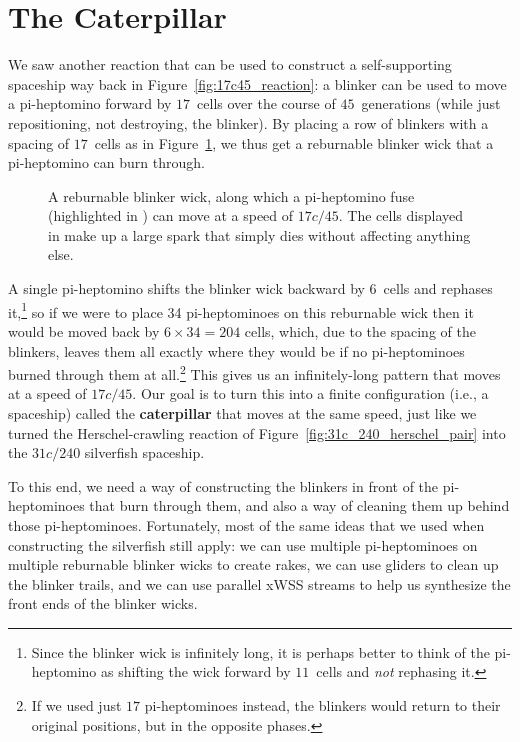 \section{The Caterpillar}\label{sec:caterpillar}

We saw another reaction that can be used to construct a self-supporting spaceship way back in Figure~\ref{fig:17c45_reaction}: a blinker can be used to move a pi-heptomino forward by $17$~cells over the course of $45$~generations (while just repositioning, not destroying, the blinker). By placing a row of blinkers with a spacing of $17$~cells as in Figure~\ref{fig:reburnable_blinker_wick}, we thus get a reburnable blinker wick that a pi-heptomino can burn through.

\begin{figure}[!htb]
	\centering
	\caption{A reburnable blinker wick, along which a pi-heptomino fuse (highlighted in ) can move at a speed of $17c/45$. The cells displayed in  make up a large spark that simply dies without affecting anything else.}\label{fig:reburnable_blinker_wick}
\end{figure}

A single pi-heptomino shifts the blinker wick backward by $6$~cells and rephases it,\footnote{Since the blinker wick is infinitely long, it is perhaps better to think of the pi-heptomino as shifting the wick forward by $11$~cells and \emph{not} rephasing it.} so if we were to place 34 pi-heptominoes on this reburnable wick then it would be moved back by $6 \times 34 = 204$ cells, which, due to the spacing of the blinkers, leaves them all exactly where they would be if no pi-heptominoes burned through them at all.\footnote{If we used just $17$ pi-heptominoes instead, the blinkers would return to their original positions, but in the opposite phases.} This gives us an infinitely-long pattern that moves at a speed of $17c/45$. Our goal is to turn this into a finite configuration (i.e., a spaceship) called the \textbf{caterpillar} that moves at the same speed, just like we turned the Herschel-crawling reaction of Figure~\ref{fig:31c_240_herschel_pair} into the $31c/240$ silverfish spaceship.

To this end, we need a way of constructing the blinkers in front of the pi-heptominoes that burn through them, and also a way of cleaning them up behind those pi-heptominoes. Fortunately, most of the same ideas that we used when constructing the silverfish still apply: we can use multiple pi-heptominoes on multiple reburnable blinker wicks to create rakes, we can use gliders to clean up the blinker trails, and we can use parallel xWSS streams to help us synthesize the front ends of the blinker wicks.

